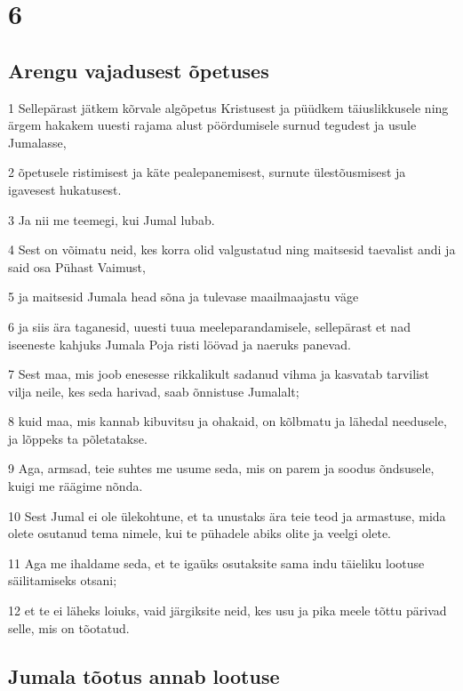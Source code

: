 \chapter{6}

\section*{Arengu vajadusest õpetuses}

\par 1 Sellepärast jätkem kõrvale algõpetus Kristusest ja püüdkem täiuslikkusele ning ärgem hakakem uuesti rajama alust pöördumisele surnud tegudest ja usule Jumalasse,
\par 2 õpetusele ristimisest ja käte pealepanemisest, surnute ülestõusmisest ja igavesest hukatusest.
\par 3 Ja nii me teemegi, kui Jumal lubab.
\par 4 Sest on võimatu neid, kes korra olid valgustatud ning maitsesid taevalist andi ja said osa Pühast Vaimust,
\par 5 ja maitsesid Jumala head sõna ja tulevase maailmaajastu väge
\par 6 ja siis ära taganesid, uuesti tuua meeleparandamisele, sellepärast et nad iseeneste kahjuks Jumala Poja risti löövad ja naeruks panevad.
\par 7 Sest maa, mis joob enesesse rikkalikult sadanud vihma ja kasvatab tarvilist vilja neile, kes seda harivad, saab õnnistuse Jumalalt;
\par 8 kuid maa, mis kannab kibuvitsu ja ohakaid, on kõlbmatu ja lähedal needusele, ja lõppeks ta põletatakse.
\par 9 Aga, armsad, teie suhtes me usume seda, mis on parem ja soodus õndsusele, kuigi me räägime nõnda.
\par 10 Sest Jumal ei ole ülekohtune, et ta unustaks ära teie teod ja armastuse, mida olete osutanud tema nimele, kui te pühadele abiks olite ja veelgi olete.
\par 11 Aga me ihaldame seda, et te igaüks osutaksite sama indu täieliku lootuse säilitamiseks otsani;
\par 12 et te ei läheks loiuks, vaid järgiksite neid, kes usu ja pika meele tõttu pärivad selle, mis on tõotatud.

\section*{Jumala tõotus annab lootuse}

